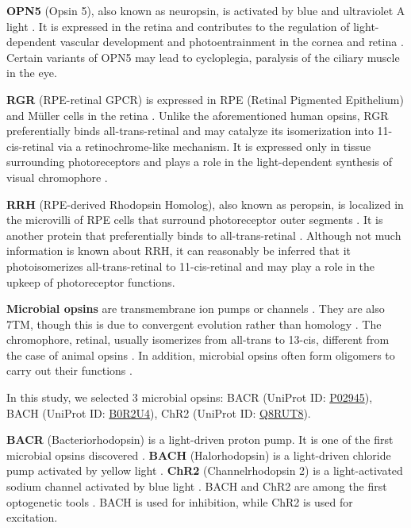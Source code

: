 \documentclass[fleqn, 10pt, lineno]{manuscript}
\begin{document}
\textbf{OPN5} (Opsin 5), also known as neuropsin, is activated by blue and ultraviolet A light \citep{Tarttelin_2003}. It is expressed in the retina and contributes to the regulation of light-dependent vascular development and photoentrainment in the cornea and retina \citep{Buhr_2015}. Certain variants of OPN5 may lead to cycloplegia, paralysis of the ciliary muscle in the eye. 

\textbf{RGR} (RPE-retinal GPCR) is expressed in RPE (Retinal Pigmented Epithelium) and M\"uller cells in the retina \citep{Shen_1994}. Unlike the aforementioned human opsins, RGR preferentially binds all-trans-retinal and may catalyze its isomerization into 11-cis-retinal via a retinochrome-like mechanism. It is expressed only in tissue surrounding photoreceptors and plays a role in the light-dependent synthesis of visual chromophore \citep{Radu_2008}.

\textbf{RRH} (RPE-derived Rhodopsin Homolog), also known as peropsin, is localized in the microvilli of RPE cells that surround photoreceptor outer segments \citep{Sun_1997}. It is another protein that preferentially binds to all-trans-retinal \citep{Cook_2017}. Although not much information is known about RRH, it can reasonably be inferred that it photoisomerizes all-trans-retinal to 11-cis-retinal and may play a role in the upkeep of photoreceptor functions. 

\textbf{Microbial opsins} are transmembrane ion pumps or channels \citep{Findlay_1986}. They are also 7TM, though this is due to convergent evolution rather than homology \citep{Yee_2013}. The chromophore, retinal, usually isomerizes from all-trans to 13-cis, different from the case of animal opsins \citep{Findlay_1986}. In addition, microbial opsins often form oligomers to carry out their functions \citep{Gmelin_2007}.

In this study, we selected 3 microbial opsins: BACR (UniProt ID: \href{https://www.uniprot.org/uniprotkb/P02945/entry}{P02945}), BACH (UniProt ID: \href{https://www.uniprot.org/uniprotkb/B0R2U4/entry}{B0R2U4}), ChR2 (UniProt ID: \href{https://www.uniprot.org/uniprotkb/Q8RUT8/entry}{Q8RUT8}). 

\textbf{BACR} (Bacteriorhodopsin) is a light-driven proton pump. It is one of the first microbial opsins discovered \citep{Oesterhelt_1971}. \textbf{BACH} (Halorhodopsin) is a light-driven chloride pump activated by yellow light \citep{Schobert_1982}. \textbf{ChR2} (Channelrhodopsin 2) is a light-activated sodium channel activated by blue light \citep{Nagel_2003}. BACH and ChR2 are among the first optogenetic tools \citep{Zhang_2007, Han_2007}. BACH is used for inhibition, while ChR2 is used for excitation. 
\end{document}
